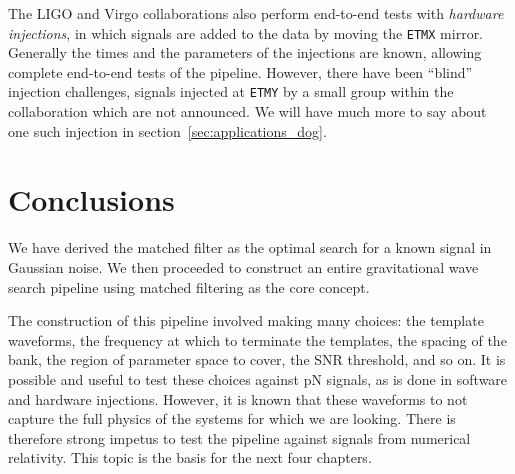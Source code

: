 The LIGO and Virgo collaborations also perform end-to-end tests with
\emph{hardware injections}, in which signals are added to the data by
moving the \texttt{ETMX} mirror.  Generally the times and the
parameters of the injections are known, allowing complete end-to-end
tests of the pipeline.  However, there have been ``blind'' injection
challenges, signals injected at \texttt{ETMY} by a small group within
the collaboration which are not announced.  We will have much more to
say about one such injection in section~\ref{sec:applications_dog}.

\section{Conclusions}

We have derived the matched filter as the optimal search for a known
signal in Gaussian noise.  We then proceeded to construct an entire
gravitational wave search pipeline using matched filtering as the core
concept.

The construction of this pipeline involved making many choices: the
template waveforms, the frequency at which to terminate the templates,
the spacing of the bank, the region of parameter space to cover, the
SNR threshold, and so on.  It is possible and useful to test
these choices against pN signals, as is done in software and hardware
injections.   However, it is known that these waveforms to not capture
the full physics of the systems for which we are looking.  There is
therefore strong impetus to test the pipeline against signals from
numerical relativity.  This topic is the basis for the next four
chapters.



